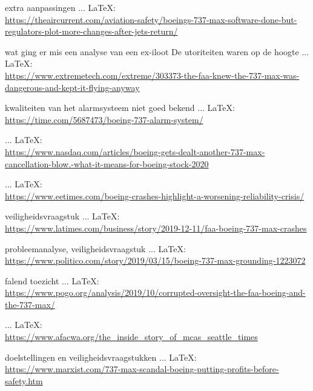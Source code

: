 \begin{thebibliography}{99}
{{{{{{{{							extra aanpassingen
							 ... \LaTeX:\\ \url{https://theaircurrent.com/aviation-safety/boeings-737-max-software-done-but-regulators-plot-more-changes-after-jets-return/}
							
							wat ging er mis een analyse van een ex-iloot
							De utoriteiten waren op de hoogte
							 ... \LaTeX:\\ \url{https://www.extremetech.com/extreme/303373-the-faa-knew-the-737-max-was-dangerous-and-kept-it-flying-anyway}
							
							kwaliteiten van het alarmsysteem niet goed bekend
							 ... \LaTeX:\\ \url{https://time.com/5687473/boeing-737-alarm-system/}
							
							 ... \LaTeX:\\ \url{https://www.nasdaq.com/articles/boeing-gets-dealt-another-737-max-cancellation-blow.-what-it-means-for-boeing-stock-2020}
							
							 ... \LaTeX:\\ \url{https://www.eetimes.com/boeing-crashes-highlight-a-worsening-reliability-crisis/}
							
							veiligheidsvraagstuk
							 ... \LaTeX:\\ \url{https://www.latimes.com/business/story/2019-12-11/faa-boeing-737-max-crashes}
							
							probleemanalyse, veiligheidsvraagstuk
							 ... \LaTeX:\\ \url{https://www.politico.com/story/2019/03/15/boeing-737-max-grounding-1223072}
							
							falend toezicht
							 ... \LaTeX:\\ \url{https://www.pogo.org/analysis/2019/10/corrupted-oversight-the-faa-boeing-and-the-737-max/}
							
							 ... \LaTeX:\\ \url{https://www.afacwa.org/the_inside_story_of_mcas_seattle_times}
							
							doelstellingen en veiligheidsvraagstukken
							 ... \LaTeX:\\ \url{https://www.marxist.com/737-max-scandal-boeing-putting-profits-before-safety.htm}
							
}}}}}}}}
\end{thebibliography}
